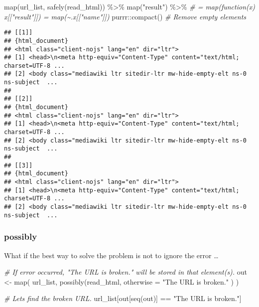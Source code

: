 \documentclass[
]{book}
\newenvironment{Shaded}{\begin{snugshade}}{\end{snugshade}}
\newcommand{\AttributeTok}[1]{\textcolor[rgb]{0.77,0.63,0.00}{#1}}
\newcommand{\CommentTok}[1]{\textcolor[rgb]{0.56,0.35,0.01}{\textit{#1}}}
\newcommand{\FunctionTok}[1]{\textcolor[rgb]{0.00,0.00,0.00}{#1}}
\newcommand{\NormalTok}[1]{#1}
\newcommand{\OtherTok}[1]{\textcolor[rgb]{0.56,0.35,0.01}{#1}}
\newcommand{\SpecialCharTok}[1]{\textcolor[rgb]{0.00,0.00,0.00}{#1}}
\newcommand{\StringTok}[1]{\textcolor[rgb]{0.31,0.60,0.02}{#1}}
\begin{document}
\begin{Shaded}
\begin{Highlighting}[]
\FunctionTok{map}\NormalTok{(url\_list, }\FunctionTok{safely}\NormalTok{(read\_html)) }\SpecialCharTok{\%\textgreater{}\%}
  \FunctionTok{map}\NormalTok{(}\StringTok{"result"}\NormalTok{) }\SpecialCharTok{\%\textgreater{}\%} 
  \CommentTok{\# = map(function(x) x[["result"]]) = map(\textasciitilde{}.x[["name"]])}
\NormalTok{  purrr}\SpecialCharTok{::}\FunctionTok{compact}\NormalTok{() }\CommentTok{\# Remove empty elements}
\end{Highlighting}
\end{Shaded}

\begin{verbatim}
## [[1]]
## {html_document}
## <html class="client-nojs" lang="en" dir="ltr">
## [1] <head>\n<meta http-equiv="Content-Type" content="text/html; charset=UTF-8 ...
## [2] <body class="mediawiki ltr sitedir-ltr mw-hide-empty-elt ns-0 ns-subject  ...
## 
## [[2]]
## {html_document}
## <html class="client-nojs" lang="en" dir="ltr">
## [1] <head>\n<meta http-equiv="Content-Type" content="text/html; charset=UTF-8 ...
## [2] <body class="mediawiki ltr sitedir-ltr mw-hide-empty-elt ns-0 ns-subject  ...
## 
## [[3]]
## {html_document}
## <html class="client-nojs" lang="en" dir="ltr">
## [1] <head>\n<meta http-equiv="Content-Type" content="text/html; charset=UTF-8 ...
## [2] <body class="mediawiki ltr sitedir-ltr mw-hide-empty-elt ns-0 ns-subject  ...
\end{verbatim}

\hypertarget{possibly}{%
\subsubsection{possibly}\label{possibly}}

What if the best way to solve the problem is not to ignore the error \ldots{}

\begin{Shaded}
\begin{Highlighting}[]
\CommentTok{\# If error occurred, "The URL is broken." will be stored in that element(s).}
\NormalTok{out }\OtherTok{\textless{}{-}} \FunctionTok{map}\NormalTok{(}
\NormalTok{  url\_list,}
  \FunctionTok{possibly}\NormalTok{(read\_html,}
    \AttributeTok{otherwise =} \StringTok{"The URL is broken."}
\NormalTok{  )}
\NormalTok{)}

\CommentTok{\# Let\textquotesingle{}s find the broken URL.}
\NormalTok{url\_list[out[}\FunctionTok{seq}\NormalTok{(out)] }\SpecialCharTok{==} \StringTok{"The URL is broken."}\NormalTok{]}
\end{Highlighting}
\end{Shaded}
\end{document}
